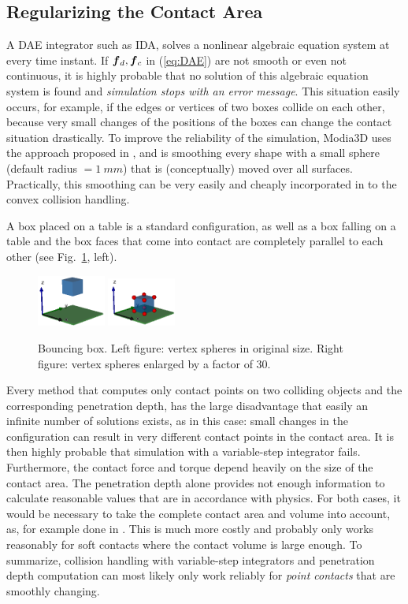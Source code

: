 \subsection{Regularizing the Contact Area}\label{sec:BouncingBox}

A DAE integrator such as IDA, solves a nonlinear algebraic
equation system at every time instant. If $\bvec{f}_d, \bvec{f}_c$ in (\ref{eq:DAE}) are not smooth or even not continuous,
it is highly probable that no solution of this algebraic equation system is found and \emph{simulation stops with an error message}.
This situation easily occurs, for example, if the edges or vertices of two boxes collide on each other, because very small changes of the
positions of the boxes can change the contact situation drastically. To improve the reliability of the simulation, Modia3D
uses the approach proposed in \cite{bergen2003}, and is smoothing every shape with a small sphere (default radius $= 1~mm$) that
is (conceptually) moved over all surfaces. Practically, this smoothing can be very easily and cheaply incorporated in to the
convex collision handling. 

A box placed on a table is a standard configuration, as well as a box falling on a table and the box faces that come into contact are completely parallel to each other (see Fig.~\ref{fig:bouncingBox}, left).
%
\begin{figure}[tb]
	\centering
	\includegraphics[width=0.2\textwidth]{figures/bouncingBox1.png}
	\includegraphics[width=0.2\textwidth]{figures/bouncingBox2.png}
	\caption{Bouncing box. Left figure: vertex spheres in original size. Right figure:
             vertex spheres enlarged by a factor of 30.}
	\label{fig:bouncingBox}
\end{figure}
%
Every method that computes only contact points on two colliding objects and the corresponding penetration depth, has the
large disadvantage that easily an infinite number of solutions exists, as in this case:
small changes in the configuration can result in very different contact points in the contact area.
It is then highly probable that simulation with a variable-step integrator fails. Furthermore, the contact force and torque
depend heavily on the size of the contact area. The penetration depth alone provides not enough information
to calculate reasonable values that are in accordance with physics. For both cases, it would be necessary to take the
complete contact area and volume into account, as, for example done in \cite{Elmqvist2015}. This is much more costly
and probably only works reasonably for soft contacts where the contact volume is large enough.
To summarize, collision handling with variable-step integrators and penetration depth computation 
can most likely only work reliably for \emph{point contacts} that are smoothly changing.

